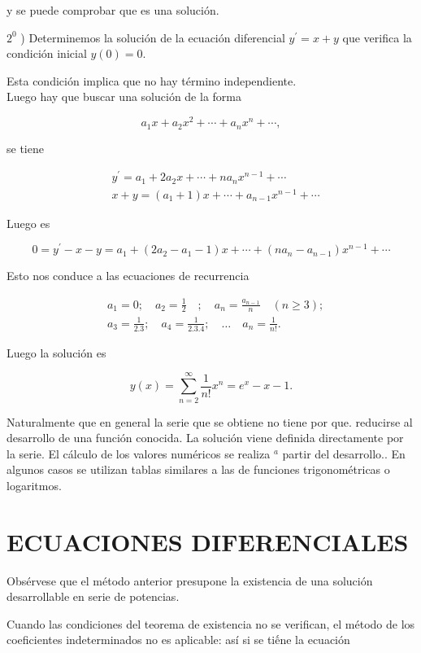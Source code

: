 \documentclass[10pt]{article}
\theoremstyle{plain}
\theoremstyle{definition}
\theoremstyle{remark}
\begin{document}
y se puede comprobar que es una solución.


$2^{0}$ ) Determinemos la solución de la ecuación diferencial $y^{\prime}=x+y$ que verifica la condición inicial $y(0)=0$.

Esta condición implica que no hay término independiente.\\
Luego hay que buscar una solución de la forma

$$
a_{1} x+a_{2} x^{2}+\cdots+a_{n} x^{n}+\cdots,
$$

se tiene

$$
\begin{aligned}
& y^{\prime}=a_{1}+2 a_{2} x+\cdots+n a_{n} x^{n-1}+\cdots \\
& x+y=\left(a_{1}+1\right) x+\cdots+a_{n-1} x^{n-1}+\cdots
\end{aligned}
$$

Luego es

$$
0=y^{\prime}-x-y=a_{1}+\left(2 a_{2}-a_{1}-1\right) x+\cdots+\left(n a_{n}-a_{n-1}\right) x^{n-1}+\cdots
$$

Esto nos conduce a las ecuaciones de recurrencia

$$
\begin{aligned}
& a_{1}=0 ; \quad a_{2}=\frac{1}{2} \quad ; \quad a_{n}=\frac{a_{n-1}}{n} \quad(n \geqslant 3) ; \\
& a_{3}=\frac{1}{2.3} ; \quad a_{4}=\frac{1}{2.3 .4} ; \quad \ldots \quad a_{n}=\frac{1}{n!} .
\end{aligned}
$$

Luego la solución es

$$
y(x)=\sum_{n=2}^{\infty} \frac{1}{n!} x^{n}=e^{x}-x-1 .
$$

Naturalmente que en general la serie que se obtiene no tiene por que. reducirse al desarrollo de una función conocida. La solución viene definida directamente por la serie. El cálculo de los valores numéricos se realiza ${ }^{a}$ partir del desarrollo.. En algunos casos se utilizan tablas similares a las de funciones trigonométricas o logaritmos.

\section*{ECUACIONES DIFERENCIALES}
Obsérvese que el método anterior presupone la existencia de una solución desarrollable en serie de potencias.

Cuando las condiciones del teorema de existencia no se verifican, el método de los coeficientes indeterminados no es aplicable: así si se tiếne la ecuación
\end{document}
